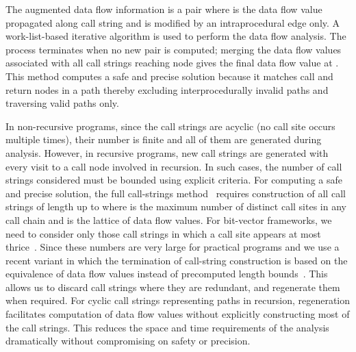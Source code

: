 \documentclass{llncs}
\begin{document}
The augmented data flow information is a pair \text{} where  is the data flow value propagated along call
string  and is modified by an intraprocedural edge only. A
work-list-based iterative algorithm is used to perform the data flow
analysis. The process terminates when no new pair \text{} is computed; merging the data flow values associated with
all call strings reaching node  gives the final data flow value at
. This method computes a safe and precise solution because it matches
call and return nodes in a path thereby excluding interprocedurally
invalid paths and traversing valid paths only.

In non-recursive programs, since the call strings are acyclic (no call
site occurs multiple times),
their number is finite and all of them are generated during analysis.
However, in recursive programs, new call strings are generated with every
visit to a call node involved in recursion. In such cases, the
number of call strings considered must be bounded using explicit criteria.
For computing a safe and precise solution, the full call-strings
method~\cite{Sharir.M.Pnueli.A:1981:Two-Approaches-to}
requires construction of all call strings of length up to  where  is the maximum number of distinct call sites in any
call chain and  is the lattice of data flow values. For bit-vector
frameworks, we need to consider only those call strings in which a call
site appears at most
thrice~\cite{Karkare.B.Khedker.UP:2007:Improved-Bound-for}.
Since these numbers are very large for practical programs and we use
a recent variant in which the termination of call-string construction is based
on the equivalence of data flow values instead of precomputed length
bounds~\cite{Khedker.UP.Karkare.B:2008:Efficiency-Precision-Simplicity,Khedker.U.Sanyal.A.Karkare.B:2009:Data-Flow-Analysis}.
This allows us to discard call strings where they are redundant, and
regenerate them when required. For cyclic call strings representing
paths in recursion,
regeneration facilitates computation of data flow values
without explicitly constructing most of the call strings. This reduces
the space and time requirements of the analysis dramatically without
compromising on safety or precision.
\end{document}
